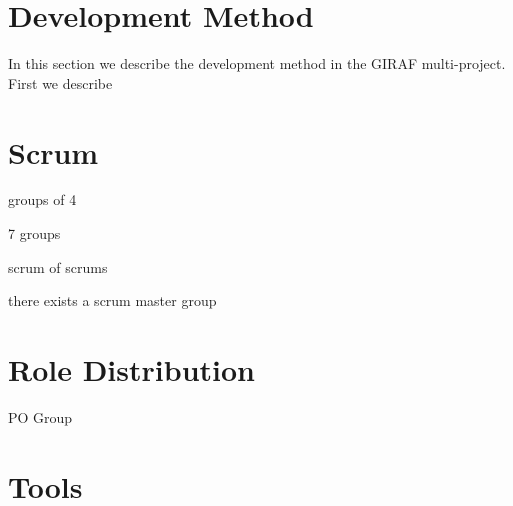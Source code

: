\section{Development Method}
In this section we describe the development method in the GIRAF multi-project.
First we describe 




\section{Scrum}

groups of 4

7 groups

scrum of scrums

there exists a scrum master group

\section{Role Distribution}

PO Group



\section{Tools}
